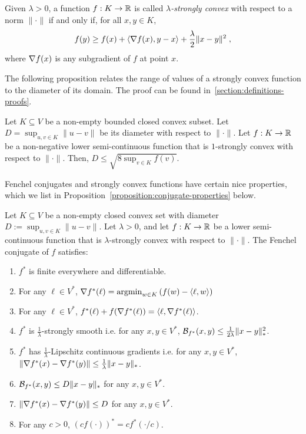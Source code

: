 Given $\lambda > 0$, a function $f:K \to \mathbb{R}$ is called \emph{$\lambda$-strongly convex}
with respect to a norm $\|\cdot\|$ if and only if, for all $x,y \in K$,
$$
f(y) \ge f(x) + \langle \nabla f(x), y - x \rangle + \frac{\lambda}{2}\|x - y\|^2 \; ,
$$
where $\nabla f(x)$ is any subgradient of $f$ at point $x$.

The following proposition relates the range of values of a strongly convex
function to the diameter of its domain. The proof can be found
in~\ref{section:definitions-proofs}.

\begin{proposition}
\label{proposition:diameter-vs-range}
Let $K \subseteq V$ be a non-empty bounded closed convex subset.  Let $D =
\sup_{u,v \in K} \|u - v\|$ be its diameter with respect to $\|\cdot\|$.  Let
$f:K \to \mathbb{R}$ be a non-negative lower semi-continuous function that is
$1$-strongly convex with respect to $\|\cdot\|$.  Then, $D \le \sqrt{8 \sup_{v
\in K} f(v)}$.
\end{proposition}

Fenchel conjugates and strongly convex functions have certain nice properties,
which we list in Proposition~\ref{proposition:conjugate-properties} below.

\begin{proposition}
\label{proposition:conjugate-properties}
Let $K \subseteq V$ be a non-empty closed convex set with diameter $D:=\sup_{u,v \in K} \|u-v\|$.
Let $\lambda > 0$, and let $f:K \to \mathbb{R}$ be a lower semi-continuous function
that is $\lambda$-strongly convex with respect to $\|\cdot\|$.
The Fenchel conjugate of $f$ satisfies:
\begin{enumerate}

\item $f^*$ is finite everywhere and differentiable.

\item For any $\ell \in V^*$, $\nabla f^*(\ell) = \operatorname*{argmin}_{w \in K} \left( f(w) - \langle \ell, w \rangle \right)$

\item For any $\ell \in V^*$, $f^*(\ell) + f(\nabla f^*(\ell)) = \langle \ell, \nabla f^*(\ell) \rangle$.

\item $f^*$ is $\frac{1}{\lambda}$-strongly smooth i.e. for any $x,y \in V^*$, $\mathcal{B}_{f^*}(x, y) \le \frac{1}{2\lambda} \|x - y\|_*^2$.

\item $f^*$ has $\frac{1}{\lambda}$-Lipschitz continuous gradients i.e.
for any $x,y \in V^*$,
$\|\nabla f^*(x) - \nabla f^*(y)\| \le \frac{1}{\lambda} \|x - y\|_*$.

\item $\mathcal{B}_{f^*}(x,y) \le D\|x-y\|_*$ for any $x,y \in V^*$.

\item $\|\nabla f^*(x) - \nabla f^*(y)\| \le D$ for any $x,y \in V^*$.

\item For any $c > 0$, $(cf(\cdot))^* = cf^*(\cdot/c)$.
\end{enumerate}
\end{proposition}

